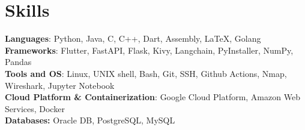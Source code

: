 


\resumeSubHeadingListEnd

%
\vspace{-10px}
\section{Skills}
\begin{itemize}[leftmargin=0.15in, label={}]
  \small{\item{
        \textbf{Languages}{: Python, Java, C, C++, Dart, Assembly, LaTeX, Golang} \\
        \textbf{Frameworks}{: Flutter, FastAPI, Flask, Kivy, Langchain, PyInstaller, NumPy, Pandas} \\
        \textbf{Tools and OS}{: Linux, UNIX shell, Bash, Git, SSH, Github Actions, Nmap, Wireshark, Jupyter Notebook} \\
        \textbf{Cloud Platform \& Containerization}{: Google Cloud Platform, Amazon Web Services, Docker} \\
        \textbf{Databases: }{Oracle DB, PostgreSQL, MySQL} \\
        }}

\end{itemize}


